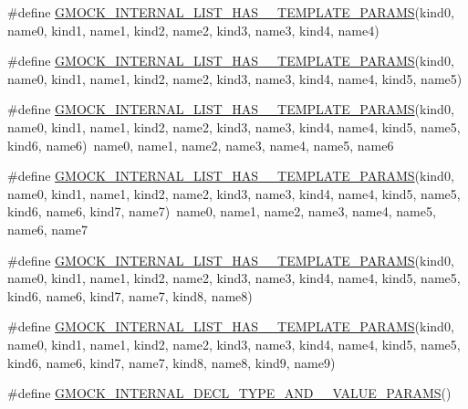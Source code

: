 \begin{DoxyCompactItemize}
\item 
\#define \hyperlink{gmock-generated-actions_8h_ad9010efd4cfd9c4874d18fef3aee7676}{G\+M\+O\+C\+K\+\_\+\+I\+N\+T\+E\+R\+N\+A\+L\+\_\+\+L\+I\+S\+T\+\_\+\+H\+A\+S\+\_\+\_\+\+T\+E\+M\+P\+L\+A\+T\+E\+\_\+\+P\+A\+R\+A\+MS}(kind0,  name0,  kind1,  name1,  kind2,  name2,  kind3,  name3,  kind4,  name4)
\item 
\#define \hyperlink{gmock-generated-actions_8h_ae9d4c983c2aba6b0fa5725118bb11cbd}{G\+M\+O\+C\+K\+\_\+\+I\+N\+T\+E\+R\+N\+A\+L\+\_\+\+L\+I\+S\+T\+\_\+\+H\+A\+S\+\_\+\_\+\+T\+E\+M\+P\+L\+A\+T\+E\+\_\+\+P\+A\+R\+A\+MS}(kind0,  name0,  kind1,  name1,  kind2,  name2,  kind3,  name3,  kind4,  name4,  kind5,  name5)
\item 
\#define \hyperlink{gmock-generated-actions_8h_ad76d91a49b437e52790b3d7efeb6f289}{G\+M\+O\+C\+K\+\_\+\+I\+N\+T\+E\+R\+N\+A\+L\+\_\+\+L\+I\+S\+T\+\_\+\+H\+A\+S\+\_\+\_\+\+T\+E\+M\+P\+L\+A\+T\+E\+\_\+\+P\+A\+R\+A\+MS}(kind0,  name0,  kind1,  name1,  kind2,  name2,  kind3,  name3,  kind4,  name4,  kind5,  name5,  kind6,  name6)~name0, name1, name2, name3, name4, name5, name6
\item 
\#define \hyperlink{gmock-generated-actions_8h_a1080c34f9f1d183b54b4b710b5a6e98d}{G\+M\+O\+C\+K\+\_\+\+I\+N\+T\+E\+R\+N\+A\+L\+\_\+\+L\+I\+S\+T\+\_\+\+H\+A\+S\+\_\+\_\+\+T\+E\+M\+P\+L\+A\+T\+E\+\_\+\+P\+A\+R\+A\+MS}(kind0,  name0,  kind1,  name1,  kind2,  name2,  kind3,  name3,  kind4,  name4,  kind5,  name5,  kind6,  name6,  kind7,  name7)~name0, name1, name2, name3, name4, name5, name6, name7
\item 
\#define \hyperlink{gmock-generated-actions_8h_a2492e9cf6abea9975cc7703e24fb4409}{G\+M\+O\+C\+K\+\_\+\+I\+N\+T\+E\+R\+N\+A\+L\+\_\+\+L\+I\+S\+T\+\_\+\+H\+A\+S\+\_\+\_\+\+T\+E\+M\+P\+L\+A\+T\+E\+\_\+\+P\+A\+R\+A\+MS}(kind0,  name0,  kind1,  name1,  kind2,  name2,  kind3,  name3,  kind4,  name4,  kind5,  name5,  kind6,  name6,  kind7,  name7,  kind8,  name8)
\item 
\#define \hyperlink{gmock-generated-actions_8h_ab216ed7cf202e5c97e4a4e4115c416d2}{G\+M\+O\+C\+K\+\_\+\+I\+N\+T\+E\+R\+N\+A\+L\+\_\+\+L\+I\+S\+T\+\_\+\+H\+A\+S\+\_\+\_\+\+T\+E\+M\+P\+L\+A\+T\+E\+\_\+\+P\+A\+R\+A\+MS}(kind0,  name0,  kind1,  name1,  kind2,  name2,  kind3,  name3,  kind4,  name4,  kind5,  name5,  kind6,  name6,  kind7,  name7,  kind8,  name8,  kind9,  name9)
\item 
\#define \hyperlink{gmock-generated-actions_8h_a9eda3221eac423c7026d63fc486d1296}{G\+M\+O\+C\+K\+\_\+\+I\+N\+T\+E\+R\+N\+A\+L\+\_\+\+D\+E\+C\+L\+\_\+\+T\+Y\+P\+E\+\_\+\+A\+N\+D\+\_\+\_\+\+V\+A\+L\+U\+E\+\_\+\+P\+A\+R\+A\+MS}()

\end{DoxyCompactItemize}
